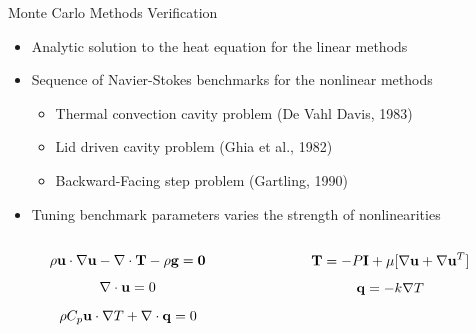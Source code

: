 \documentclass{beamer}
\begin{document}
\begin{frame}{Monte Carlo Methods Verification}

  \begin{itemize}
  \item Analytic solution to the heat equation for the linear methods
  \item Sequence of Navier-Stokes benchmarks for the nonlinear methods
    \begin{itemize}
    \item Thermal convection cavity problem (De Vahl Davis, 1983)
    \item Lid driven cavity problem (Ghia et al., 1982)
    \item Backward-Facing step problem (Gartling, 1990)
    \end{itemize}
  \item Tuning benchmark parameters varies the strength of
    nonlinearities
  \end{itemize}

  \begin{columns}
    \begin{column}{0.5\textwidth}
      \[
      \rho \mathbf{u} \cdot \nabla \mathbf{u} - \nabla \cdot \mathbf{T} - \rho
      \mathbf{g} = \mathbf{0}
      \]
      \[
      \nabla \cdot \mathbf{u} = 0
      \]
      \[
      \rho C_p \mathbf{u} \cdot \nabla T + \nabla \cdot \mathbf{q} = 0
      \]
    \end{column}

    \begin{column}{0.5\textwidth}
      \[
      \mathbf{T} = -P \mathbf{I} + \mu[\nabla \mathbf{u} + \nabla \mathbf{u}^T]
      \]
      \[
      \mathbf{q} = - k \nabla T
      \]
    \end{column}
  \end{columns}

\end{frame}
\end{document}
